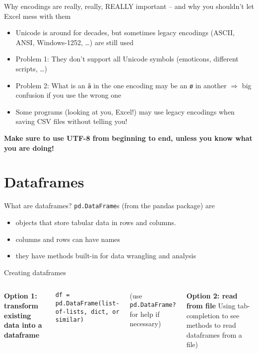 \documentclass[compress]{beamer}
\begin{document}
\begin{frame}{Why encodings are really, really, REALLY important -- and why you shouldn't let Excel mess with them}
\begin{itemize}
	\item Unicode is around for decades, but sometimes legacy encodings (ASCII, ANSI, Windows-1252, \ldots) are still used
	\item Problem 1: They don't support all Unicode symbols (emoticons, different scripts, \ldots)
	\item Problem 2: What is an \texttt{\"a} in the one encoding may be an \texttt{\o}  in another $\Rightarrow$ big confusion if you use the wrong one
	\item Some programs (looking at you, Excel!) may use legacy encodings when saving CSV files without telling you!
\end{itemize}
\textbf{Make sure to use UTF-8 from beginning to end, unless you know what you are doing!}

\end{frame}



\section{Dataframes}


\begin{frame}{What are dataframes?}
\texttt{pd.DataFrame}s (from the pandas package) are
	\begin{itemize}
		\item objects that store tabular data in rows and columns.
		\item columns and rows can have names
		\item they have methods built-in for data wrangling and analysis
	\end{itemize}

\end{frame}

\begin{frame}{Creating dataframes}
	\begin{columns}[T]
\textbf{Option 1: transform existing data into a dataframe}
	
\texttt{df = pd.DataFrame(list-of-lists, dict, or similar)}

(use \texttt{pd.DataFrame?} for help if necessary)

\textbf{Option 2: read from file}
Using tab-completion to see methods to read dataframes from a file)
	\end{columns}
\end{frame}
\end{document}
